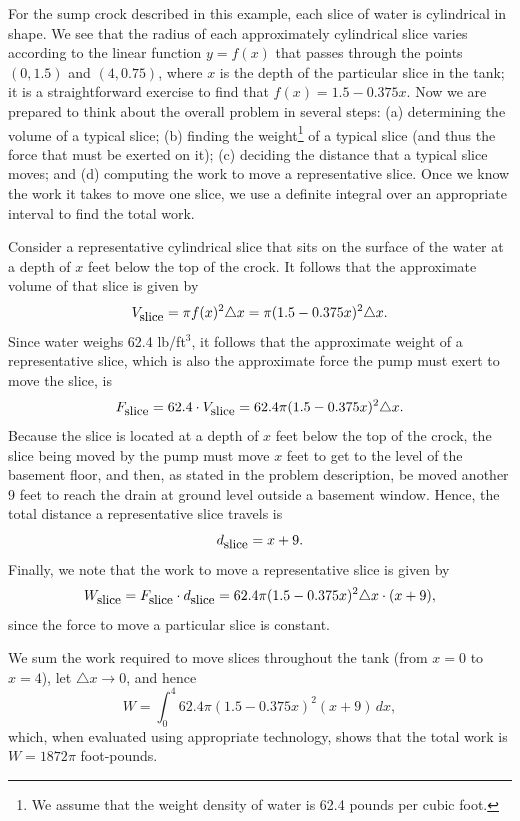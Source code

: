 For the sump crock described in this example, each slice of water is cylindrical in shape.  We see that the radius of each approximately cylindrical slice varies according to the linear function $y = f(x)$ that passes through the points $(0,1.5)$ and $(4,0.75)$, where $x$ is the depth of the particular slice in the tank; it is a straightforward exercise to find that $f(x) = 1.5 - 0.375x$.  Now we are prepared to think about the overall problem in several steps:  (a) determining the volume of a typical slice; (b) finding the weight\footnote{We assume that the weight density of water  is 62.4 pounds per cubic foot.} of a typical slice (and thus the force that must be exerted on it); (c) deciding the distance that a typical slice moves; and (d) computing the work to move a representative slice.  Once we know the work it takes to move one slice, we use a definite integral over an appropriate interval to find the total work.

Consider a representative cylindrical slice that sits on the surface of the water at a depth of $x$ feet below the top of the crock.  It follows that the approximate volume of that slice is given by 
$$V_{\mbox{\small{slice}}} = \pi f(x)^2 \triangle x = \pi (1.5 - 0.375x)^2 \triangle x.$$
Since water weighs 62.4 lb/ft$^3$, it follows that the approximate weight of a representative slice, which is also the approximate force the pump must exert to move the slice, is
$$F_{\mbox{\small{slice}}} = 62.4 \cdot V_{\mbox{\small{slice}}} = 62.4 \pi (1.5 - 0.375x)^2 \triangle x.$$
Because the slice is located at a depth of $x$ feet below the top of the crock, the slice being moved by the pump must move $x$ feet to get to the level of the basement floor, and then, as stated in the problem description, be moved another 9 feet to reach the drain at ground level outside a basement window.  Hence, the total distance a representative slice travels is
$$d_{\mbox{\small{slice}}} = x + 9.$$
Finally, we note that the work to move a representative slice is given by 
$$W_{\mbox{\small{slice}}} = F_{\mbox{\small{slice}}} \cdot d_{\mbox{\small{slice}}} = 62.4 \pi (1.5 - 0.375x)^2 \triangle x \cdot (x+9),$$
since the force to move a particular slice is constant.

We sum the work required to move slices throughout the tank (from $x = 0$ to $x = 4$), let $\triangle x \to 0$, and hence 
$$W = \int_0^4 62.4 \pi (1.5 - 0.375x)^2 (x+9) \, dx,$$
which, when evaluated using appropriate technology, shows that the total work is $W = 1872\pi$ foot-pounds.

